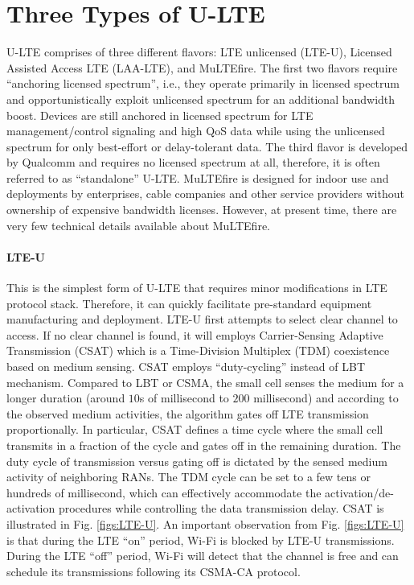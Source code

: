 \section{Three Types of U-LTE}
\label{lte-types}
U-LTE comprises of three different flavors: LTE unlicensed (LTE-U), Licensed Assisted Access LTE (LAA-LTE), and MuLTEfire. The first two flavors require ``anchoring licensed spectrum'', i.e., they operate primarily in licensed spectrum and opportunistically exploit unlicensed spectrum for an additional bandwidth boost. Devices are still anchored in licensed spectrum for LTE management/control signaling and high QoS data while using the unlicensed spectrum for only best-effort or delay-tolerant data. The third flavor is developed by Qualcomm and requires no licensed spectrum at all, therefore, it is often referred to as ``standalone'' U-LTE. MuLTEfire is designed for indoor use and deployments by enterprises, cable companies and other service providers without ownership of expensive bandwidth licenses. However, at present time, there are very few technical details available about MuLTEfire.


\paragraph{LTE-U}

\noindent This is the simplest form of U-LTE that requires minor modifications in LTE protocol stack. Therefore, it can quickly facilitate pre-standard equipment manufacturing and deployment. LTE-U first attempts to select clear channel to access. If no clear channel is found, it will employs Carrier-Sensing Adaptive Transmission (CSAT) which is a Time-Division Multiplex (TDM) coexistence based on medium sensing. CSAT employs ``duty-cycling'' instead of LBT mechanism. Compared to LBT or CSMA, the small cell senses the medium for a longer duration (around $10$s of millisecond to $200$ millisecond) and according to the observed medium activities, the algorithm gates off LTE transmission proportionally. In particular, CSAT defines a time cycle where the small cell transmits in a fraction of the cycle and gates off in the remaining duration. The duty cycle of transmission versus gating off is dictated by the sensed medium activity of neighboring RANs. The TDM cycle can be set to a few tens or hundreds of millisecond, which can effectively accommodate the activation/de-activation procedures while controlling the data transmission delay. CSAT is illustrated in Fig. \ref{figs:LTE-U}. An important observation from Fig. \ref{figs:LTE-U} is that during the LTE ``on'' period, Wi-Fi is blocked by LTE-U transmissions. During the LTE ``off'' period, Wi-Fi will detect that the channel is free and can schedule its transmissions following its CSMA-CA protocol.

